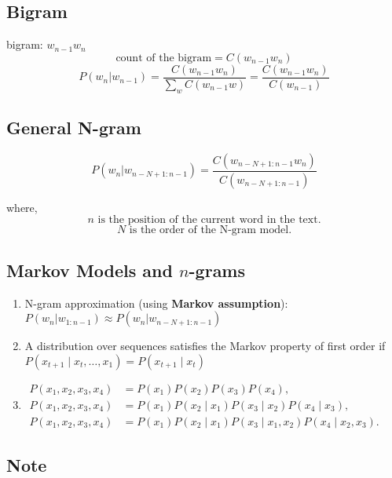 \subsection{Bigram \cite{nlp-1}}
bigram: \(w_{n-1}w_n\)
\[
    \text{count of the bigram} = C(w_{n-1}w_n)
\]
\[
    P(w_n|w_{n-1}) = \dfrac{C(w_{n-1}w_n)}{\sum_w C(w_{n-1}w)} = \dfrac{C(w_{n-1}w_n)}{C(w_{n-1})} 
\]

\subsection{General N-gram \cite{nlp-1}}

\[
    P(w_n|w_{n-N+1:n-1}) = \dfrac{C(w_{n-N+1:n-1} w_n)}{C(w_{n-N+1:n-1})}
\]

where,
\[
    n \text{ is the position of the current word in the text.}
\]
\[
    N \text{ is the order of the N-gram model.}
\]


\subsection{Markov Models and $n$-grams \cite{dnn-1,wiki-n-gram}}

\begin{enumerate}[itemsep=0.2cm]
    \item N-gram approximation (using \textbf{Markov assumption}):
    $
        P(w_n|w_{1:n-1}) \approx P(w_n|w_{n-N+1:n-1})
    $

    \item A distribution over sequences satisfies the Markov property of first order if $P(x_{t+1} \mid x_t, \ldots, x_1) = P(x_{t+1} \mid x_t)$ \cite{dnn-1}

    \item $
        \begin{aligned}
        P(x_1, x_2, x_3, x_4) &=  P(x_1) P(x_2) P(x_3) P(x_4),\\
        P(x_1, x_2, x_3, x_4) &=  P(x_1) P(x_2  \mid  x_1) P(x_3  \mid  x_2) P(x_4  \mid  x_3),\\
        P(x_1, x_2, x_3, x_4) &=  P(x_1) P(x_2  \mid  x_1) P(x_3  \mid  x_1, x_2) P(x_4  \mid  x_2, x_3).
        \end{aligned}
    $ \hfill \cite{dnn-1}

\end{enumerate}


\subsection*{Note}

